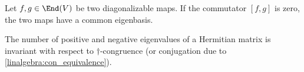     \begin{property}[Commutator]
        Let $f,g\in\End(V)$ be two diagonalizable maps. If the commutator $[f,g]$ is zero, the two maps have a common eigenbasis.
    \end{property}

    \begin{theorem}\label{linalgebra:sylvester}
        The number of positive and negative eigenvalues of a Hermitian matrix is invariant with respect to $\dag$-congruence (or conjugation due to \cref{linalgebra:con_equivalence}).
    \end{theorem}